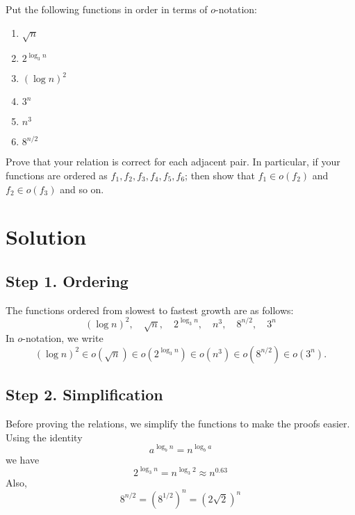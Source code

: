 \documentclass[11pt]{article}
\begin{document}
    \setlength{\headheight}{26pt}
    \pagestyle{fancy}
    \fancyfoot[C]{}
    \fancyfoot[R]{\thepage}
    \renewcommand{\headrulewidth}{0.4pt}
    \renewcommand{\footrulewidth}{0.4pt}
    
	
    
    \begin{tcolorbox}[title={Problem 1 (20 pts)}]
        Put the following functions in order in terms of $o$-notation:
        \begin{enumerate}
            \item $\sqrt{n}$
            \item $2^{\log_3 n}$
            \item $(\log n )^2$
            \item $3^n$
            \item $n^3$
            \item $8^{n/2}$
        \end{enumerate}
        Prove that your relation is correct for each adjacent pair. In particular, if your functions are ordered as $f_1,f_2,f_3,f_4,f_5,f_6$; then show that $f_1 \in o(f_2)$ and $f_2 \in o(f_3)$ and so on.
    \end{tcolorbox}
    \section*{Solution}
    \subsection*{Step 1. Ordering}
    The functions ordered from slowest to fastest growth are as follows:
    \[
    (\log n)^2, \quad \sqrt{n},\quad 2^{\log_3 n},\quad n^3,\quad 8^{n/2},\quad 3^n
    \]
    In $o$-notation, we write
    \[
    (\log n)^2 \in o(\sqrt{n}) \in o(2^{\log_3 n}) \in o(n^3) \in o(8^{n/2}) \in o(3^n).
    \]

    \subsection*{Step 2. Simplification}
    Before proving the relations, we simplify the functions to make the proofs easier. \\
    Using the identity
    \[
    a^{\log_b n} = n^{\log_b a}
    \]
    we have
    \[
    2^{\log_3 n} = n^{\log_3 2} \approx n^{0.63}
    \]
    Also,
    \[
    8^{n/2} = (8^{1/2})^n = (2\sqrt{2})^n
    \]
\end{document}
